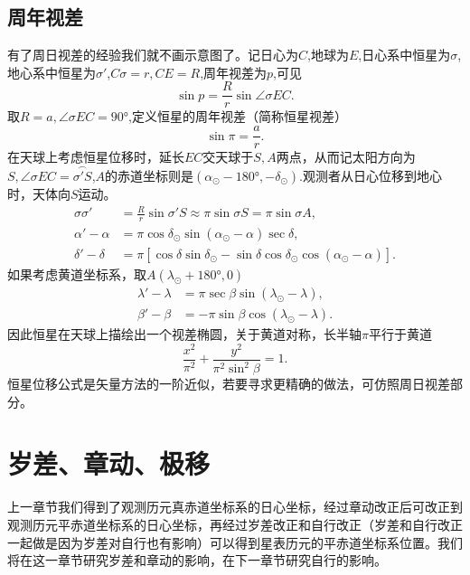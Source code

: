 \documentclass[11pt, a4paper, oneside]{ctexart}
\numberwithin{equation}{subsection}
\begin{document}
\subsection{周年视差}
有了周日视差的经验我们就不画示意图了。记日心为$C$,地球为$E$,日心系中恒星为$\sigma$,地心系中恒星为$\sigma'$,$C\sigma=r,CE=R$,周年视差为$p$,可见
\begin{equation}
\sin p=\frac{R}{r}\sin\angle{\sigma EC}.
\end{equation}
取$R=a,\angle{\sigma EC}=\ang{90;;}$,定义恒星的周年视差（简称恒星视差）
\begin{equation}
\sin\pi=\frac{a}{r}.
\end{equation}
在天球上考虑恒星位移时，延长$EC$交天球于$S,A$两点，从而记太阳方向为$S,\angle{\sigma EC}=\overset{\frown}{\sigma'S}$,$A$的赤道坐标则是$\left(\alpha_{\odot}-\ang{180;;},-\delta{}_{\odot}\right)$.观测者从日心位移到地心时，天体向$S$运动。
\begin{align}
\sigma\sigma'&=\frac{R}{r}\sin\sigma'S\approx\pi\sin\sigma S=\pi\sin\sigma A,\\
\alpha'-\alpha&=\pi\cos\delta_\odot\sin\left(\alpha_\odot-\alpha\right)\sec\delta,\\
\delta'-\delta&=\pi\left[\cos\delta\sin\delta_\odot-\sin\delta\cos\delta_\odot\cos\left(\alpha_\odot-\alpha\right)\right].
\end{align}
如果考虑黄道坐标系，取$A\left(\lambda_\odot+\ang{180;;},0\right)$
\begin{align}
\lambda'-\lambda&=\pi\sec\beta\sin\left(\lambda_\odot-\lambda\right),\\
\beta'-\beta&=-\pi\sin\beta\cos\left(\lambda_\odot-\lambda\right).
\end{align}
因此恒星在天球上描绘出一个视差椭圆，关于黄道对称，长半轴$\pi$平行于黄道
\begin{equation}
\frac{x^2}{\pi^2}+\frac{y^2}{\pi^2\sin^2\beta}=1.
\end{equation}
恒星位移公式是矢量方法的一阶近似，若要寻求更精确的做法，可仿照周日视差部分。

\section{岁差、章动、极移}
上一章节我们得到了观测历元真赤道坐标系的日心坐标，经过章动改正后可改正到观测历元平赤道坐标系的日心坐标，再经过岁差改正和自行改正（岁差和自行改正一起做是因为岁差对自行也有影响）可以得到星表历元的平赤道坐标系位置。我们将在这一章节研究岁差和章动的影响，在下一章节研究自行的影响。
\end{document}
